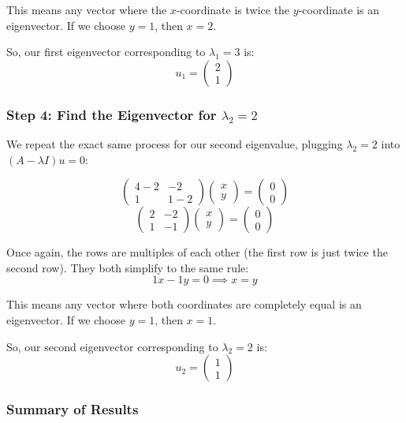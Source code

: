 \documentclass{article}
\begin{document}
This means any vector where the $x$-coordinate is twice the $y$-coordinate is an eigenvector. If we choose $y = 1$, then $x = 2$. 

So, our first eigenvector corresponding to $\lambda_1 = 3$ is:
\[ u_1 = \begin{pmatrix} 2 \\ 1 \end{pmatrix} \]

\subsubsection*{Step 4: Find the Eigenvector for $\lambda_2 = 2$}

We repeat the exact same process for our second eigenvalue, plugging $\lambda_2 = 2$ into $(A - \lambda I)u = 0$:

\[ \begin{pmatrix} 4-2 & -2 \\ 1 & 1-2 \end{pmatrix} \begin{pmatrix} x \\ y \end{pmatrix} = \begin{pmatrix} 0 \\ 0 \end{pmatrix} \]
\[ \begin{pmatrix} 2 & -2 \\ 1 & -1 \end{pmatrix} \begin{pmatrix} x \\ y \end{pmatrix} = \begin{pmatrix} 0 \\ 0 \end{pmatrix} \]

Once again, the rows are multiples of each other (the first row is just twice the second row). They both simplify to the same rule:
\[ 1x - 1y = 0 \implies x = y \]

This means any vector where both coordinates are completely equal is an eigenvector. If we choose $y = 1$, then $x = 1$.

So, our second eigenvector corresponding to $\lambda_2 = 2$ is:
\[ u_2 = \begin{pmatrix} 1 \\ 1 \end{pmatrix} \]

\subsubsection*{Summary of Results}
\end{document}
